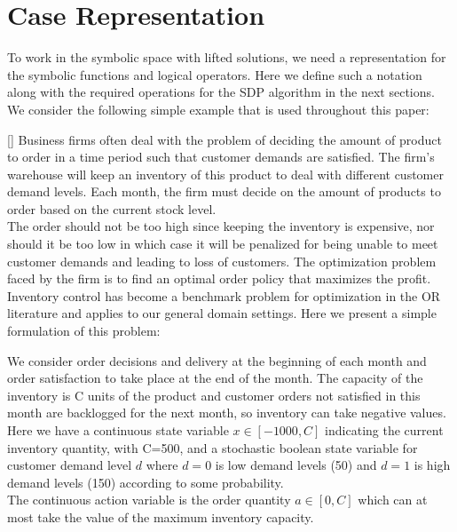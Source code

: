 \documentclass[letterpaper]{article}
\renewcommand{\-}{\text{-}}
\begin{document}
\section{Case Representation}

To work in the symbolic space with lifted solutions, we need a representation for the symbolic functions and logical operators. Here we define such a notation along with the required operations for the SDP algorithm in the next sections. We consider the following simple example that is used throughout this paper:

[\InventoryControl] Business firms often deal with the problem of deciding  the amount of product to order in a time period such that customer demands are satisfied. 
The firm's warehouse will keep an inventory of this product to deal with different customer demand levels. Each month, the firm must decide on the amount of products 
to order based on the current stock level. \\
The order should not be too high since keeping the inventory is expensive, nor should it be too low in which case
it will be penalized for being unable to meet customer demands and leading to loss of customers. The optimization problem faced by the firm is to find an optimal 
order policy that maximizes the profit. Inventory control has become a benchmark problem for optimization in the OR literature and applies to our general domain settings. Here we present a simple formulation of this problem: 
\vspace{+5mm}
\begin{example*}[\InventoryControl]
We consider order decisions and delivery at the beginning of each month and order satisfaction to take place at the end of the month. 
The capacity of the inventory is C units of the product and customer orders not satisfied in this month are backlogged for the next month, so inventory can take negative values.  
\\Here we have a continuous state variable $x \in [-1000,C]$ indicating the current inventory quantity, with C=500, and a stochastic boolean state variable for customer demand level $d$ where $d=0$ is low demand levels (50) and $d=1$ is high demand levels (150) according to some probability. \\
The continuous action variable is the order quantity $a \in [0,C]$ which can at most take the value of the maximum inventory capacity. \\
\end{example*}
\end{document}
